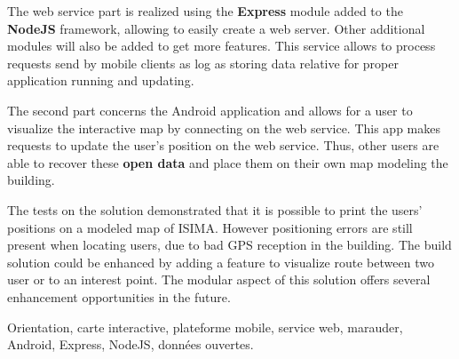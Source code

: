 The web service part is realized using the \textbf{Express} module added to the \textbf{NodeJS} framework, allowing to easily create a web server. Other additional modules will also be added to get more features. This service allows to process requests send by mobile clients as log as storing data relative for proper application running and updating.

The second part concerns the Android application and allows for a user to visualize the interactive map by connecting on the web service. This app makes requests to update the user's position on the web service. Thus, other users are able to recover these \textbf{open data} and place them on their own map modeling the building.

The tests on the solution demonstrated that it is possible to print the users' positions on a modeled map of ISIMA. However positioning errors are still present when locating users, due to bad GPS reception in the building. The build solution could be enhanced by adding a feature to visualize route between two user or to an interest point. The modular aspect of this solution offers several enhancement opportunities in the future.


Orientation, carte interactive, plateforme mobile, service web, marauder, Android, Express, NodeJS, données ouvertes.